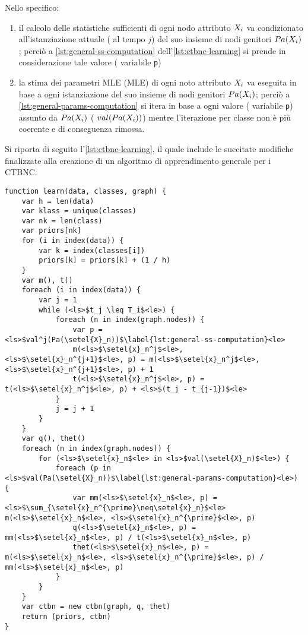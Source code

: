 Nello specifico:
\begin{enumerate}
    \item il calcolo delle statistiche sufficienti di ogni nodo attributo $\mathnormal{X}_i$ va condizionato all'istanziazione attuale (\ie{} al tempo $j$) del suo insieme di nodi genitori $Pa(\mathnormal{X}_i)$; perciò a \autoref{lst:general-ss-computation} dell'\autoref{lst:ctbnc-learning} si prende in considerazione tale valore (\ie{} variabile \lstinline[]|p|)
    \item la stima dei parametri \acl{MLE} (\acs{MLE}) di ogni noto attributo $\mathnormal{X}_i$ va eseguita in base a ogni istanziazione del suo insieme di nodi genitori $Pa(\mathnormal{X}_i)$; perciò a \autoref{lst:general-params-computation} si itera in base a ogni valore (\ie{} variabile \lstinline[]|p|) assunto da $Pa(\mathnormal{X}_i)$ (\ie{} $val(Pa(\mathnormal{X}_i))$) mentre l'iterazione per classe non è più coerente e di conseguenza rimossa.
\end{enumerate}
Si riporta di seguito l'\autoref{lst:ctbnc-learning}, il quale include le succitate modifiche finalizzate alla creazione di un algoritmo di apprendimento generale per i \acs{CTBNC}.
\begin{lstlisting}[caption=Apprendimento di un classificatore \acs{CTBN}, label=lst:ctbnc-learning, language=pseudo]
function learn(data, classes, graph) {
    var h = len(data)
    var klass = unique(classes)
    var nk = len(class)
    var priors[nk]
    for (i in index(data)) {
        var k = index(classes[i])
        priors[k] = priors[k] + (1 / h)
    }
    var m(), t()
    foreach (i in index(data)) {
        var j = 1
        while (<ls>$t_j \leq T_i$<le>) {
            foreach (n in index(graph.nodes)) {
                var p = <ls>$val^j(Pa(\setel{X}_n))$\label{lst:general-ss-computation}<le>
                m(<ls>$\setel{x}_n^j$<le>, <ls>$\setel{x}_n^{j+1}$<le>, p) = m(<ls>$\setel{x}_n^j$<le>, <ls>$\setel{x}_n^{j+1}$<le>, p) + 1
                t(<ls>$\setel{x}_n^j$<le>, p) = t(<ls>$\setel{x}_n^j$<le>, p) + <ls>$(t_j - t_{j-1})$<le>
            }
            j = j + 1
        }
    }
    var q(), thet()
    foreach (n in index(graph.nodes)) {
        for (<ls>$\setel{x}_n$<le> in <ls>$val(\setel{X}_n)$<le>) {
            foreach (p in <ls>$val(Pa(\setel{X}_n))$\label{lst:general-params-computation}<le>) {
                var mm(<ls>$\setel{x}_n$<le>, p) = <ls>$\sum_{\setel{x}_n^{\prime}\neq\setel{x}_n}$<le> m(<ls>$\setel{x}_n$<le>, <ls>$\setel{x}_n^{\prime}$<le>, p)
                q(<ls>$\setel{x}_n$<le>, p) = mm(<ls>$\setel{x}_n$<le>, p) / t(<ls>$\setel{x}_n$<le>, p)
                thet(<ls>$\setel{x}_n$<le>, p) = m(<ls>$\setel{x}_n$<le>, <ls>$\setel{x}_n^{\prime}$<le>, p) / mm(<ls>$\setel{x}_n$<le>, p)
            }
        }
    }
    var ctbn = new ctbn(graph, q, thet)
    return (priors, ctbn)
}
\end{lstlisting}\vspace*{8pt}

